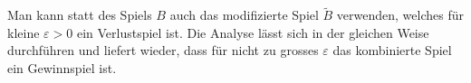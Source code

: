 Man kann statt des Spiels $B$ auch das modifizierte Spiel $\tilde{B}$ 
verwenden, welches für kleine $\varepsilon>0$ ein Verlustspiel ist.
Die Analyse lässt sich in der gleichen Weise durchführen und liefert
wieder, dass für nicht zu grosses $\varepsilon$ das kombinierte Spiel
ein Gewinnspiel ist.




